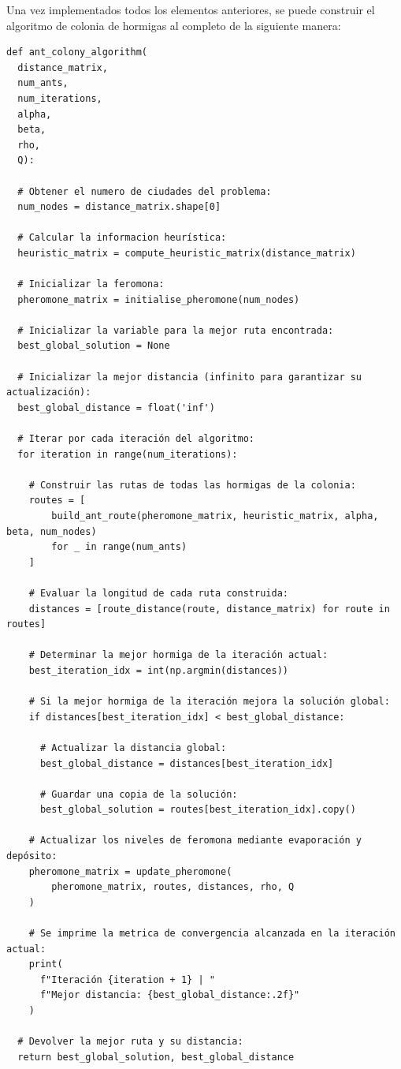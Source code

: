 Una vez implementados todos los elementos anteriores, se puede construir el algoritmo de colonia de hormigas al completo de 
la siguiente manera:
\newline
\begin{lstlisting}[style=PythonStyle]
def ant_colony_algorithm(
  distance_matrix,
  num_ants,
  num_iterations,
  alpha,
  beta,
  rho,
  Q):
 
  # Obtener el numero de ciudades del problema:
  num_nodes = distance_matrix.shape[0]
 
  # Calcular la informacion heurística:
  heuristic_matrix = compute_heuristic_matrix(distance_matrix)

  # Inicializar la feromona:
  pheromone_matrix = initialise_pheromone(num_nodes)
 
  # Inicializar la variable para la mejor ruta encontrada:
  best_global_solution = None
 
  # Inicializar la mejor distancia (infinito para garantizar su actualización):
  best_global_distance = float('inf')
 
  # Iterar por cada iteración del algoritmo:
  for iteration in range(num_iterations):
 
    # Construir las rutas de todas las hormigas de la colonia:
    routes = [
        build_ant_route(pheromone_matrix, heuristic_matrix, alpha, beta, num_nodes)
        for _ in range(num_ants)
    ]
 
    # Evaluar la longitud de cada ruta construida:
    distances = [route_distance(route, distance_matrix) for route in routes]
 
    # Determinar la mejor hormiga de la iteración actual:
    best_iteration_idx = int(np.argmin(distances))
 
    # Si la mejor hormiga de la iteración mejora la solución global:
    if distances[best_iteration_idx] < best_global_distance:
 
      # Actualizar la distancia global:
      best_global_distance = distances[best_iteration_idx]
 
      # Guardar una copia de la solución:
      best_global_solution = routes[best_iteration_idx].copy()
 
    # Actualizar los niveles de feromona mediante evaporación y depósito:
    pheromone_matrix = update_pheromone(
        pheromone_matrix, routes, distances, rho, Q
    )
 
    # Se imprime la metrica de convergencia alcanzada en la iteración actual:
    print(
      f"Iteración {iteration + 1} | "
      f"Mejor distancia: {best_global_distance:.2f}"
    )
 
  # Devolver la mejor ruta y su distancia:
  return best_global_solution, best_global_distance
\end{lstlisting}

